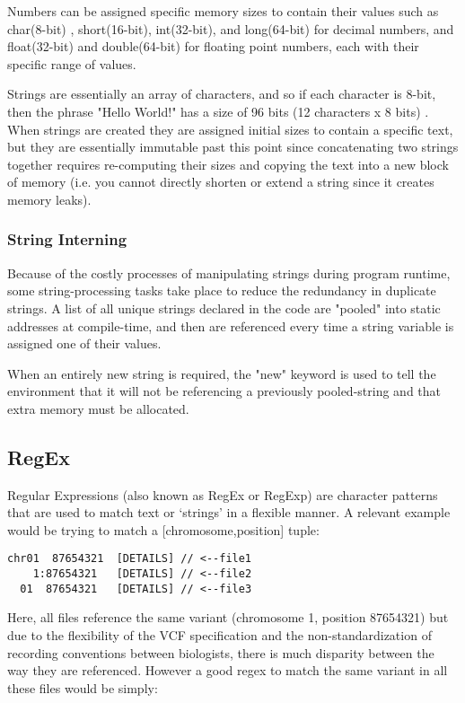 Numbers can be assigned specific memory sizes to contain their values such as char(8-bit) , short(16-bit), int(32-bit), and long(64-bit) for decimal numbers, and float(32-bit) and double(64-bit) for floating point numbers, each with their specific range of values.

Strings are essentially an array of characters, and so if each character is 8-bit, then the phrase "Hello World!" has a size of 96 bits (12 characters x 8 bits) . When strings are created they are assigned initial sizes to contain a specific text, but they are essentially immutable past this point since concatenating two strings together requires re-computing their sizes and copying the text into a new block of memory (i.e. you cannot directly shorten or extend a string since it creates memory leaks).

\subsubsection{String Interning}

Because of the costly processes of manipulating strings during program runtime, some string-processing tasks take place to reduce the redundancy in duplicate strings. A list of all unique strings declared in the code are "pooled" into static addresses at compile-time, and then are referenced every time a string variable is assigned one of their values. 

When an entirely new string is required, the "new" keyword is used to tell the environment that it will not be referencing a previously pooled-string and that extra memory must be allocated.


\subsection{RegEx}\label{ref:app:regex}

Regular Expressions (also known as RegEx or RegExp) are character patterns that are used to match text or `strings' in a flexible manner. A relevant example would be trying to match a [chromosome,position] tuple:

\begin{lstlisting}
chr01  87654321  [DETAILS] // <--file1
    1:87654321   [DETAILS] // <--file2
  01  87654321   [DETAILS] // <--file3
\end{lstlisting}

Here, all files reference the same variant (chromosome 1, position 87654321) but due to the flexibility of the VCF specification and the non-standardization of recording conventions between biologists, there is much disparity between the way they are referenced. However a good regex to match the same variant in all these files would be simply:

